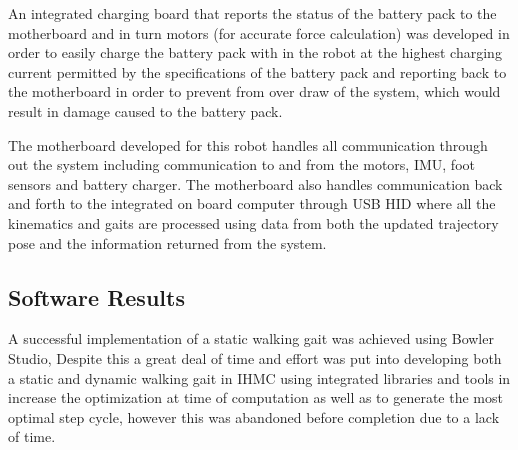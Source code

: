 An integrated charging board that reports the status of the battery pack to the motherboard and in turn motors (for accurate force calculation) was developed in order to easily charge the battery pack with in the robot at the highest charging current permitted by the specifications of the battery pack and reporting back to the motherboard in order to prevent from over draw of the system, which would result in damage caused to the battery pack. 

The motherboard developed for this robot handles all communication through out the system including communication to and from the motors, IMU, foot sensors and battery charger. The motherboard also handles communication back and forth to the integrated on board computer through USB HID where all the kinematics and gaits are processed using data from both the updated trajectory pose and the information returned from the system. 

\subsection{Software Results}
A successful implementation of a static walking gait was achieved using Bowler Studio, Despite this a great deal of time and effort was put into developing both a static and dynamic walking gait in IHMC using integrated libraries and tools in increase the optimization at time of computation as well as to generate the most optimal step cycle, however this was abandoned before completion due to a lack of time.
